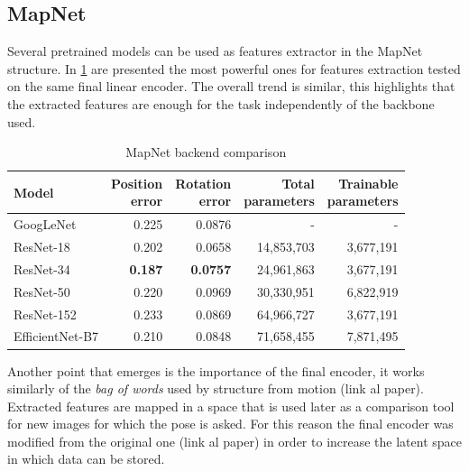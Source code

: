 \subsection{MapNet}
Several pretrained models can be used as features extractor in the MapNet structure. In \cref{tab:mapnet-backends} are presented the most powerful ones for features extraction tested on the same final linear encoder. The overall trend is similar, this highlights that the extracted features are enough for the task independently of the backbone used.
\begin{table}[htbp]
    \caption{MapNet backend comparison}
    \begin{center}
        \begin{tabular}{lrrrr}
            \toprule
            {Model}         & \thead{Position                                            \\error} & \thead{Rotation\\error} & \thead{Total\\parameters} & \thead{Trainable\\parameters} \\
            \midrule
            GoogLeNet       & 0.225           & 0.0876          & -          & -         \\
            ResNet-18       & 0.202           & 0.0658          & 14,853,703 & 3,677,191 \\
            ResNet-34       & \textbf{0.187}  & \textbf{0.0757} & 24,961,863 & 3,677,191 \\
            ResNet-50       & 0.220           & 0.0969          & 30,330,951 & 6,822,919 \\
            ResNet-152      & 0.233           & 0.0869          & 64,966,727 & 3,677,191 \\
            EfficientNet-B7 & 0.210           & 0.0848          & 71,658,455 & 7,871,495 \\
            \bottomrule
        \end{tabular}
        \label{tab:mapnet-backends}
    \end{center}
\end{table}

Another point that emerges is the importance of the final encoder, it works similarly of the \textit{bag of words} used by structure from motion (link al paper). Extracted features are mapped in a space that is used later as a comparison tool for new images for which the pose is asked.
For this reason the final encoder was modified from the original one (link al paper) in order to increase the latent space in which data can be stored.

